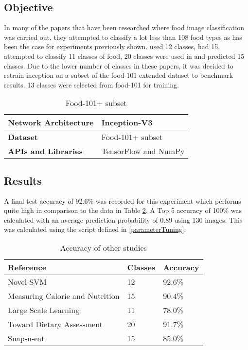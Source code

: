 \tocless\subsection{Objective}
In many of the papers that have been researched where food image classification was carried out, they attempted to classify a lot less than 108 food types as has been the case for experiments previously shown.
\parencite{novelSVM} used 12 classes, \parencite{pouladzadeh2014measuring} had 15, \parencite{LSL_2015} attempted to classify 11 classes of food, 20 classes were used in \parencite{chen2010toward} and \parencite{snap} predicted 15 classes.
Due to the lower number of classes in these papers, it was decided to retrain inception on a subset of the food-101 extended dataset to benchmark results.
13 classes were selected from food-101 for training.

\begin{table}[h]
\centering
\caption{Food-101+ subset}
\label{my-label}
\begin{tabular}{|l|p{8cm}|}
\hline
\textbf{Network Architecture} & Inception-V3          \\ \hline
\textbf{Dataset}              & Food-101+ subset  \\ \hline
\textbf{APIs and Libraries}   & TensorFlow and NumPy                                                       \\ \hline
\end{tabular}
\end{table}

\tocless\subsection{Results}
A final test accuracy of 92.6\% was recorded for this experiment which performs quite high in comparison to the data in Table \ref{classes_accuracy}.
A Top 5 accuracy of 100\% was calculated with an average prediction probability of 0.89 using 130 images.
This was calculated using the script defined in \ref{parameterTuning}.

\begin{table}[]
\centering
\caption{Accuracy of other studies}
\label{classes_accuracy}
\begin{tabular}{|l|l|l|}
\hline
\textbf{Reference}                       & \textbf{Classes} & \textbf{Accuracy}      \\ \hline
Novel SVM                       & 12      & 92.6\%        \\ \hline
Measuring Calorie and Nutrition & 15      & 90.4\%       \\ \hline
Large Scale Learning            & 11      & 78.0\%          \\ \hline
Toward Dietary Assessment       & 20      & 91.7\% \\ \hline
Snap-n-eat                      & 15      & 85.0\%         \\ \hline
\end{tabular}
\end{table}

